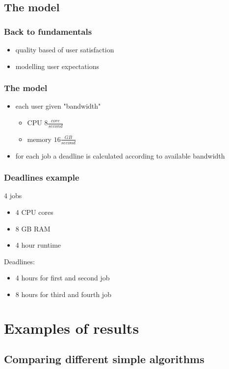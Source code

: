 \subsection{The model}

\begin{frame}
	\frametitle{Back to fundamentals}
	\begin{itemize}
		\item quality based of user satisfaction
		\item modelling user expectations
	\end{itemize}
\end{frame}

\begin{frame}
	\frametitle{The model}
	\begin{itemize}
		\item each user given "bandwidth"
		\begin{itemize}
			\item CPU $8\frac{core}{second}$
			\item memory $16\frac{GB}{second}$
		\end{itemize}
		\item for each job a deadline is calculated according to available bandwidth
	\end{itemize}
\end{frame}

\begin{frame}
	\frametitle{Deadlines example}
	4 jobs
	\begin{itemize}
		\item 4 CPU cores
		\item 8 GB RAM
		\item 4 hour runtime
	\end{itemize}
	Deadlines:
	\begin{itemize}
		\item 4 hours for first and second job
		\item 8 hours for third and fourth job
	\end{itemize}
\end{frame}

\section{Examples of results}
\subsection{Comparing different simple algorithms}

